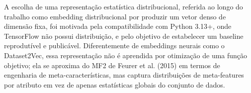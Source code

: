 A escolha de uma representação estatística distribucional, referida ao longo do trabalho como embedding distribucional por produzir um vetor denso de dimensão fixa, foi motivada pela compatibilidade com Python 3.13+, onde TensorFlow não possui distribuição, e pelo objetivo de estabelecer um baseline reprodutível e publicável. Diferentemente de embeddings neurais como o Dataset2Vec, essa representação não é aprendida por otimização de uma função objetivo; ela se aproxima do MF2 de Feurer et al. (2015) em termos de engenharia de meta-características, mas captura distribuições de meta-features por atributo em vez de apenas estatísticas globais do conjunto de dados.
